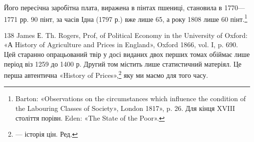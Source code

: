 Його пересічна заробітна плата, виражена в пінтах пшениці,
становила в 1770—1771 рр. 90 пінт, за часів Ідна (1797 р.)
вже лише 65, а року 1808 лише 60 пінт.\footnote{
Barton: «Observations on the circumstances which influence the
condition of the Labouring Classes of Society», London 1817», p. 26. Для
кінця XVIII століття порівн. Eden: «The State of the Poor».
}

138 James Е. Th. Rogers, Prof, of Political Economy in the University
of Oxford: «А History of Agriculture and Prices in England», Oxford
1866, vol. I, p. 690. Цей старанно опрацьований твір у досі виданих двох
перших томах обіймає лише період віз 1259 до 1400 р. Другий том містить
лише статистичний матеріял. Це перша автентична «History of Prices»,\footnote*{
— історія цін. Ред.
}
яку ми маємо для того часу.

